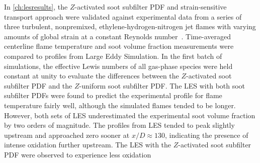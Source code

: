 In \cref{ch:lesresults}, the $Z$-activated soot subfilter PDF and strain-sensitive transport approach were validated against experimental data from a series of three turbulent, nonpremixed, ethylene-hydrogen-nitrogen jet flames with varying amounts of global strain at a constant Reynolds number~\cite{mahmoud2017}. Time-averaged centerline flame temperature and soot volume fraction measurements were compared to profiles from Large Eddy Simulation. In the first batch of simulations, the effective Lewis numbers of all gas-phase species were held constant at unity to evaluate the differences between the $Z$-activated soot subfilter PDF and the $Z$-uniform soot subfilter PDF. The LES with both soot subfilter PDFs were found to predict the experimental profile for flame temperature fairly well, although the simulated flames tended to be longer. However, both sets of LES underestimated the experimental soot volume fraction by two orders of magnitude. The profiles from LES tended to peak slightly upstream and approached zero sooner at $x/D \approx 130$, indicating the presence of intense oxidation further upstream. The LES with the $Z$-activated soot subfilter PDF were observed to experience less oxidation 
